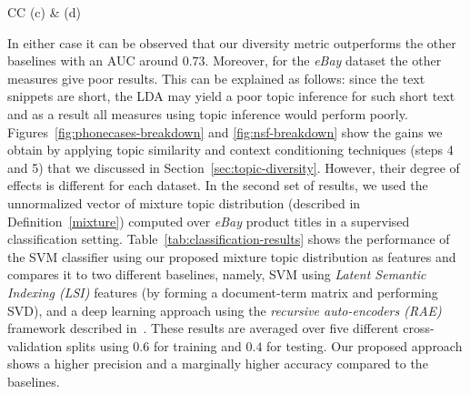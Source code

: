 \begin{table}[t]
\begin{center}
\begin{tabular}{CC}
(c) & (d)\\
\end{tabular}
\end{center}
\caption{ROC curves presenting the results of experiments on
the eBay dataset (a,b) and NSF proposal dataset (c,d). The
comparison plots (a,c) show the results for our approach (JSD-Sim-Con)
against other methods, while the plots (b,d)
show different variations of our approach. }
\label{fig:roc-curves}
\end{table}


In either case it can be observed
that our diversity metric outperforms the other baselines with an AUC
around $0.73$. Moreover, for the {\em eBay} dataset the other measures
give poor results. This can be explained as follows: since the
text snippets are short, the LDA may yield a poor topic inference for such short text and as a result all measures using topic inference would perform poorly. Figures~\ref{fig:phonecases-breakdown} and \ref{fig:nsf-breakdown} show the gains we obtain by applying topic similarity and context conditioning techniques (steps 4 and 5) that we discussed in Section~\ref{sec:topic-diversity}. However, their degree of effects is different for each
dataset.  In the second set of results, we used the unnormalized vector of mixture topic
distribution (described in Definition~\ref{mixture}) computed over
{\em eBay} product titles in a supervised classification
setting. Table~\ref{tab:classification-results} shows
the performance of the SVM classifier using our proposed mixture topic
distribution as features and compares it to two different baselines, namely, SVM using
{\em Latent Semantic Indexing (LSI)} features (by forming a
document-term matrix and performing SVD), and a deep learning approach
using the {\em recursive auto-encoders (RAE)} framework described
in~\cite{Socher:2011:SRA:2145432.2145450}. These results are averaged
over five different cross-validation splits using $0.6$ for training
and $0.4$ for testing. Our proposed approach shows a higher precision
and a marginally higher accuracy compared to the baselines.
